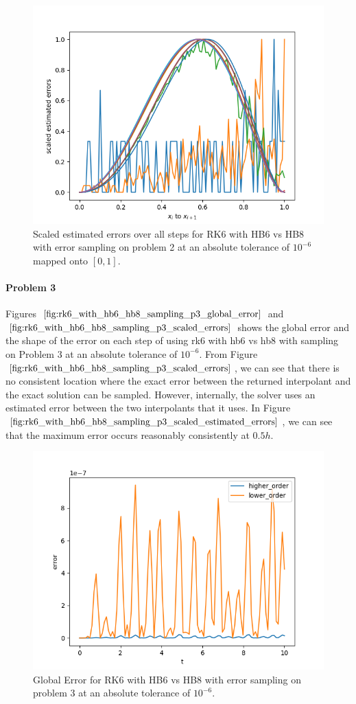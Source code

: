 \begin{figure}[H]
\centering
\includegraphics[width=0.7\linewidth]{./figures/rk6_with_hb6_hb8_sampling_p2_scaled_estimated_errors}
\caption{Scaled estimated errors over all steps for RK6 with HB6 vs HB8 with error sampling on problem 2 at an absolute tolerance of $10^{-6}$ mapped onto $[0, 1]$.}
\label{fig:rk6_with_hb6_hb8_sampling_p2_scaled_estimated_errors}
\end{figure}

\paragraph{Problem 3} Figures $\ref{fig:rk6_with_hb6_hb8_sampling_p3_global_error}$ and $\ref{fig:rk6_with_hb6_hb8_sampling_p3_scaled_errors}$ shows the global error and the shape of the error on each step of using rk6 with hb6 vs hb8 with sampling on Problem 3 at an absolute tolerance of $10^{-6}$. From Figure $\ref{fig:rk6_with_hb6_hb8_sampling_p3_scaled_errors}$, we can see that there is no consistent location where the exact error between the returned interpolant and the exact solution can be sampled. However, internally, the solver uses an estimated error between the two interpolants that it uses. In Figure $\ref{fig:rk6_with_hb6_hb8_sampling_p3_scaled_estimated_errors}$, we can see that the maximum error occurs reasonably consistently at $0.5h$.

\begin{figure}[H]
\centering
\includegraphics[width=0.7\linewidth]{./figures/rk6_with_hb6_hb8_sampling_p3_global_error}
\caption{Global Error for RK6 with HB6 vs HB8 with error sampling on problem 3 at an absolute tolerance of $10^{-6}$.}
\label{fig:rk6_with_hb6_hb8_sampling_p3_global_error}
\end{figure}

